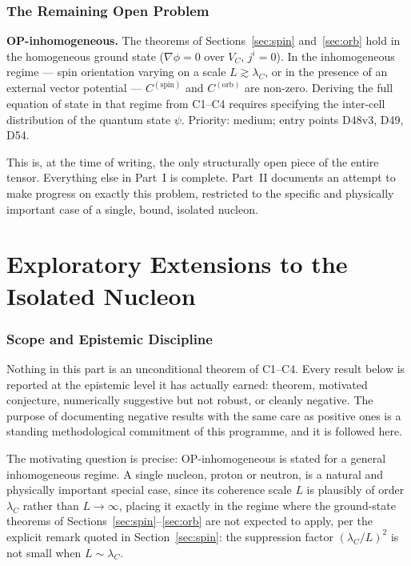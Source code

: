 \documentclass[11pt,a4paper]{article}
\newcommand{\VC}{V_C}
\newcommand{\lamC}{\lambda_C}
\newcommand{\Cspin}{C^{(\mathrm{spin})}}
\newcommand{\Corb}{C^{(\mathrm{orb})}}
\begin{document}
\section{The Remaining Open Problem}
\label{sec:openproblem}

\begin{openprobbox}[label=op:inhomog]
\textbf{OP-inhomogeneous.} The theorems of Sections~\ref{sec:spin} and~\ref{sec:orb} hold in the homogeneous ground state ($\nabla\phi=0$ over $\VC$, $j^i=0$). In the inhomogeneous regime --- spin orientation varying on a scale $L\gtrsim\lamC$, or in the presence of an external vector potential --- $\Cspin$ and $\Corb$ are non-zero. Deriving the full equation of state in that regime from C1--C4 requires specifying the inter-cell distribution of the quantum state $\psi$. Priority: medium; entry points D48v3, D49, D54.
\end{openprobbox}

This is, at the time of writing, the only structurally open piece of the entire tensor. Everything else in Part~I is complete. Part~II documents an attempt to make progress on exactly this problem, restricted to the specific and physically important case of a single, bound, isolated nucleon.

\clearpage

\part{Exploratory Extensions to the Isolated Nucleon}

\section{Scope and Epistemic Discipline}

Nothing in this part is an unconditional theorem of C1--C4. Every result below is reported at the epistemic level it has actually earned: theorem, motivated conjecture, numerically suggestive but not robust, or cleanly negative. The purpose of documenting negative results with the same care as positive ones is a standing methodological commitment of this programme, and it is followed here.

The motivating question is precise: OP-inhomogeneous is stated for a general inhomogeneous regime. A single nucleon, proton or neutron, is a natural and physically important special case, since its coherence scale $L$ is plausibly of order $\lamC$ rather than $L\to\infty$, placing it exactly in the regime where the ground-state theorems of Sections~\ref{sec:spin}--\ref{sec:orb} are not expected to apply, per the explicit remark quoted in Section~\ref{sec:spin}: the suppression factor $(\lamC/L)^2$ is not small when $L\sim\lamC$.
\end{document}
